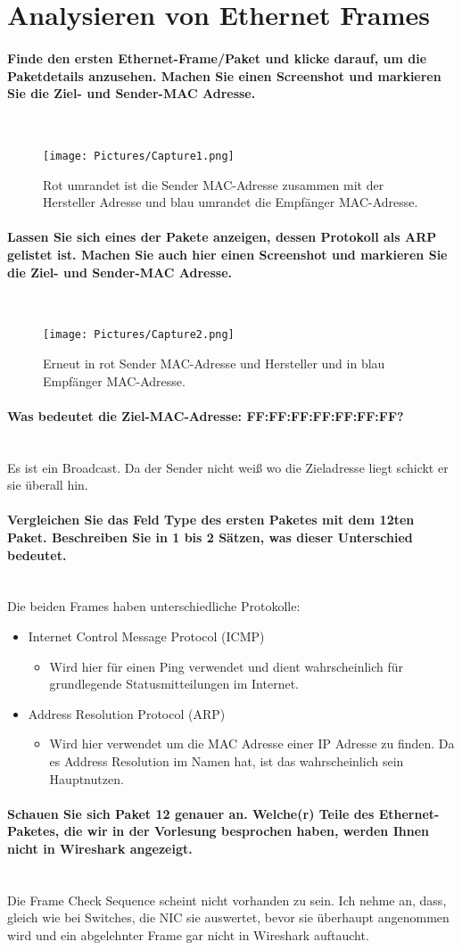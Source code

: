 \documentclass{article}
\newcommand{\paragraphlb}[1]{\paragraph{#1}\mbox{}\\}
\begin{document}
	\section{Analysieren von Ethernet Frames}
	\paragraphlb{Finde den ersten Ethernet-Frame/Paket und klicke darauf, um die Paketdetails anzusehen. Machen Sie einen Screenshot und markieren Sie die Ziel- und Sender-MAC Adresse.}
	\begin{figure}[H]
		\centering
		\texttt{[image: Pictures/Capture1.png]}
		\caption{Rot umrandet ist die Sender MAC-Adresse zusammen mit der Hersteller Adresse und blau umrandet die Empfänger MAC-Adresse.}
	\end{figure}
	\paragraphlb{Lassen Sie sich eines der Pakete anzeigen, dessen Protokoll als ARP gelistet ist. Machen Sie auch
	hier einen Screenshot und markieren Sie die Ziel- und Sender-MAC Adresse.}
	\begin{figure}[H]
		\centering
		\texttt{[image: Pictures/Capture2.png]}
		\caption{Erneut in rot Sender MAC-Adresse und Hersteller und in blau Empfänger MAC-Adresse.}
	\end{figure}
	\paragraphlb{Was bedeutet die Ziel-MAC-Adresse: FF:FF:FF:FF:FF:FF:FF?}
	Es ist ein Broadcast. Da der Sender nicht weiß wo die Zieladresse liegt schickt er sie überall hin.
	\paragraphlb{Vergleichen Sie das Feld Type des ersten Paketes mit dem 12ten Paket. Beschreiben Sie in 1 bis 2 Sätzen, was dieser Unterschied bedeutet.}
	Die beiden Frames haben unterschiedliche Protokolle:
	\begin{itemize}
		\item{Internet Control Message Protocol (ICMP)}
		\begin{itemize}
			\item{Wird hier für einen Ping verwendet und dient wahrscheinlich für grundlegende Statusmitteilungen im Internet.}
		\end{itemize}
		\item{Address Resolution Protocol (ARP)}
		\begin{itemize}
			\item{Wird hier verwendet um die MAC Adresse einer IP Adresse zu finden. Da es Address Resolution im Namen hat, ist das wahrscheinlich sein Hauptnutzen.}
		\end{itemize}
	\end{itemize}
	\paragraphlb{Schauen Sie sich Paket 12 genauer an. Welche(r) Teile des Ethernet-Paketes, die wir in der Vorlesung besprochen haben, werden Ihnen nicht in Wireshark angezeigt.}
	Die Frame Check Sequence scheint nicht vorhanden zu sein. Ich nehme an, dass, gleich wie bei Switches, die NIC sie auswertet, bevor sie überhaupt angenommen wird und ein abgelehnter Frame gar nicht in Wireshark auftaucht.
\end{document}
